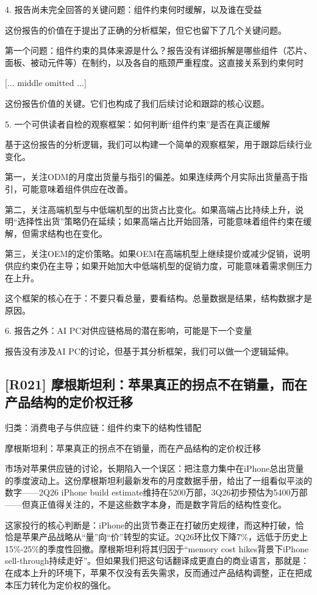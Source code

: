 \documentclass[11pt]{ctexart}
\begin{document}
4. 报告尚未完全回答的关键问题：组件约束何时缓解，以及谁在受益

这份报告的价值在于提出了正确的分析框架，但它也留下了几个关键问题。

第一个问题：组件约束的具体来源是什么？报告没有详细拆解是哪些组件（芯片、面板、被动元件等）在制约，以及各自的瓶颈严重程度。这直接关系到约束何时

[... middle omitted ...]

这份报告价值的关键。它们也构成了我们后续讨论和跟踪的核心议题。

5. 一个可供读者自检的观察框架：如何判断“组件约束”是否在真正缓解

基于这份报告的分析逻辑，我们可以构建一个简单的观察框架，用于跟踪后续行业变化。

第一，关注ODM的月度出货量与指引的偏差。如果连续两个月实际出货量高于指引，可能意味着组件供应在改善。

第二，关注高端机型与中低端机型的出货占比变化。如果高端占比持续上升，说明“选择性出货”策略仍在延续；如果高端占比开始回落，可能意味着组件约束在缓解，但需求结构也在变化。

第三，关注OEM的定价策略。如果OEM在高端机型上继续提价或减少促销，说明供应约束仍在主导；如果开始加大中低端机型的促销力度，可能意味着需求侧压力在上升。

这个框架的核心在于：不要只看总量，要看结构。总量数据是结果，结构数据才是原因。

6. 报告之外：AI PC对供应链格局的潜在影响，可能是下一个变量

报告没有涉及AI PC的讨论，但基于其分析框架，我们可以做一个逻辑延伸。

\subsection{[R021] 摩根斯坦利：苹果真正的拐点不在销量，而在产品结构的定价权迁移}
{\small\color{refgray}归类：消费电子与供应链：组件约束下的结构性错配}

摩根斯坦利：苹果真正的拐点不在销量，而在产品结构的定价权迁移

市场对苹果供应链的讨论，长期陷入一个误区：把注意力集中在iPhone总出货量的季度波动上。这份摩根斯坦利最新发布的月度数据手册，给出了一组看似平淡的数字——2Q26 iPhone build estimate维持在5200万部，3Q26初步预估为5400万部——但真正值得关注的，不是这些数字本身，而是数字背后的结构性变化。

这家投行的核心判断是：iPhone的出货节奏正在打破历史规律，而这种打破，恰恰是苹果产品战略从“量”向“价”转型的实证。2Q26环比仅下降7\%，远低于历史上15\%-25\%的季度性回撤。摩根斯坦利将其归因于“memory cost hikes背景下iPhone sell-through持续走好”。但如果我们把这句话翻译成更直白的商业语言，那就是：在成本上升的环境下，苹果不仅没有丢失需求，反而通过产品结构调整，正在把成本压力转化为定价权的强化。
\end{document}
